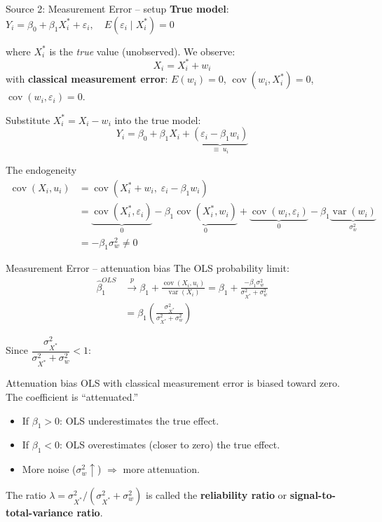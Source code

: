 \documentclass[10pt]{beamer}
\begin{document}
\begin{frame}{Source 2: Measurement Error -- setup}
\label{slide:meas_err_setup}
\textbf{True model}: $Y_i = \beta_0 + \beta_1 X_i^* + \varepsilon_i, \quad E(\varepsilon_i \mid X_i^*) = 0$

where $X_i^*$ is the \emph{true} value (unobserved). We observe:
\[
X_i = X_i^* + w_i
\]
with \textbf{classical measurement error}: $E(w_i) = 0$, $\operatorname{cov}(w_i, X_i^*) = 0$, $\operatorname{cov}(w_i, \varepsilon_i) = 0$.

\pause
Substitute $X_i^* = X_i - w_i$ into the true model:
\[
Y_i = \beta_0 + \beta_1 X_i + \underbrace{(\varepsilon_i - \beta_1 w_i)}_{\equiv\; u_i}
\]

\pause
\begin{alertblock}{The endogeneity}
\vspace{-0.5em}
\begin{align*}
\operatorname{cov}(X_i, u_i) &= \operatorname{cov}(X_i^* + w_i, \; \varepsilon_i - \beta_1 w_i)\\
&= \underbrace{\operatorname{cov}(X_i^*, \varepsilon_i)}_{0} - \beta_1\underbrace{\operatorname{cov}(X_i^*, w_i)}_{0}
 + \underbrace{\operatorname{cov}(w_i, \varepsilon_i)}_{0} - \beta_1 \underbrace{\operatorname{var}(w_i)}_{\sigma_w^2} \\
&= -\beta_1 \sigma_w^2 \neq 0
\end{align*}
\end{alertblock}
\end{frame}

\begin{frame}{Measurement Error -- attenuation bias}
\label{slide:attenuation}
The OLS probability limit:
\begin{align*}
\widehat{\beta}_1^{OLS} &\xrightarrow{p} \beta_1 + \frac{\operatorname{cov}(X_i, u_i)}{\operatorname{var}(X_i)} = \beta_1 + \frac{-\beta_1 \sigma_w^2}{\sigma_{X^*}^2 + \sigma_w^2} \\[6pt]
&= \beta_1 \left(\frac{\sigma_{X^*}^2}{\sigma_{X^*}^2 + \sigma_w^2}\right)
\end{align*}

\pause
Since $\dfrac{\sigma_{X^*}^2}{\sigma_{X^*}^2 + \sigma_w^2} < 1$:

\begin{block}{Attenuation bias}
OLS with classical measurement error is \alert{biased toward zero}. The coefficient is ``attenuated.''
\begin{itemize}
  \item If $\beta_1 > 0$: OLS underestimates the true effect.
  \item If $\beta_1 < 0$: OLS overestimates (closer to zero) the true effect.
  \item More noise ($\sigma_w^2 \uparrow$) $\Rightarrow$ more attenuation.
\end{itemize}
\end{block}

\pause
\vspace{0.3em}
{\small The ratio $\lambda = \sigma_{X^*}^2 / (\sigma_{X^*}^2 + \sigma_w^2)$ is called the \textbf{reliability ratio} or \textbf{signal-to-total-variance ratio}.}
\end{frame}
\end{document}
